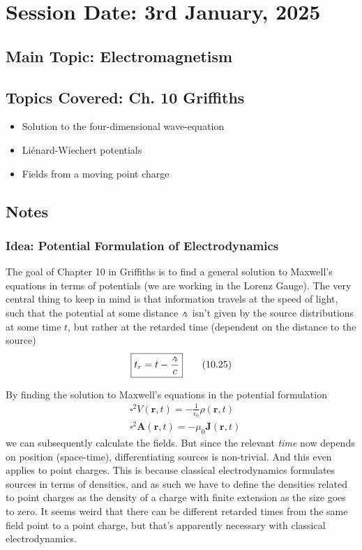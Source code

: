 \section{Session Date: 3rd January, 2025}
\subsection*{Main Topic: Electromagnetism}
\subsection*{Topics Covered: Ch. 10 Griffiths}
\begin{itemize}
    \item Solution to the four-dimensional wave-equation
    \item Liénard-Wiechert potentials
    \item Fields from a moving point charge
\end{itemize}

\subsection*{Notes}
\subsubsection*{Idea: Potential Formulation of Electrodynamics}
The goal of Chapter 10 in Griffiths is to find a general solution to Maxwell's equations in terms of potentials (we are working in the Lorenz Gauge). The very central thing to keep in mind is that information travels at the speed of light, such that the potential at some distance \(\griffr[2]\) isn't given by the source distributions at some time \(t\), but rather at the retarded time (dependent on the distance to the source) \begin{align*}
    \boxed{t_r = t - \frac{\griffr[2] }{c}}\tag{10.25}
\end{align*}

By finding the solution to Maxwell's equations in the potential formulation 
\begin{align*}
    &\square^{2} V(\mathbf{r}, t) = - \frac{1}{\epsilon _0} \rho (\mathbf{r}, t)\\
    &\square^{2} \mathbf{A}(\mathbf{r}, t) = -\mu _0 \mathbf{J}(\mathbf{r}, t)
\end{align*}
we can subsequently calculate the fields. But since the relevant \textit{time} now depends on position (space-time), differentiating sources is non-trivial. And this even applies to point charges. This is because classical electrodynamics formulates sources in terms of densities, and as such we have to define the densities related to point charges as the density of a charge with finite extension as the size goes to zero. It seems weird that there can be different retarded times from the same field point to a point charge, but that's apparently necessary with classical electrodynamics. 

